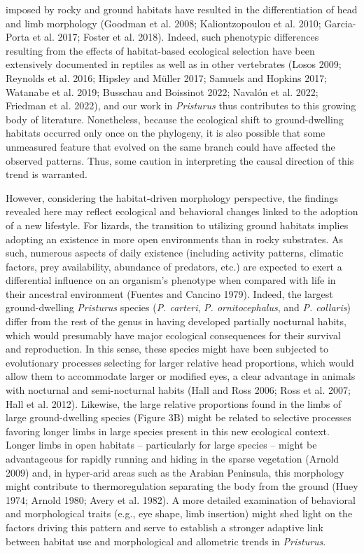 \documentclass[
  11pt,
]{article}
\begin{document}
imposed by rocky and ground habitats have resulted in the
differentiation of head and limb morphology (Goodman et al. 2008;
Kaliontzopoulou et al. 2010; Garcia-Porta et al. 2017; Foster et al.
2018). Indeed, such phenotypic differences resulting from the effects of
habitat-based ecological selection have been extensively documented in
reptiles as well as in other vertebrates (Losos 2009; Reynolds et al.
2016; Hipsley and Müller 2017; Samuels and Hopkins 2017; Watanabe et al.
2019; Busschau and Boissinot 2022; Navalón et al. 2022; Friedman et al.
2022), and our work in \emph{Pristurus} thus contributes to this growing
body of literature. Nonetheless, because the ecological shift to
ground-dwelling habitats occurred only once on the phylogeny, it is also
possible that some unmeasured feature that evolved on the same branch
could have affected the observed patterns. Thus, some caution in
interpreting the causal direction of this trend is warranted.
\hfill\break

However, considering the habitat-driven morphology perspective, the
findings revealed here may reflect ecological and behavioral changes
linked to the adoption of a new lifestyle. For lizards, the transition
to utilizing ground habitats implies adopting an existence in more open
environments than in rocky substrates. As such, numerous aspects of
daily existence (including activity patterns, climatic factors, prey
availability, abundance of predators, etc.) are expected to exert a
differential influence on an organism's phenotype when compared with
life in their ancestral environment (Fuentes and Cancino 1979). Indeed,
the largest ground-dwelling \emph{Pristurus} species (\emph{P. carteri},
\emph{P. ornitocephalus}, and \emph{P. collaris}) differ from the rest
of the genus in having developed partially nocturnal habits, which would
presumably have major ecological consequences for their survival and
reproduction. In this sense, these species might have been subjected to
evolutionary processes selecting for larger relative head proportions,
which would allow them to accommodate larger or modified eyes, a clear
advantage in animals with nocturnal and semi-nocturnal habits (Hall and
Ross 2006; Ross et al. 2007; Hall et al. 2012). Likewise, the large
relative proportions found in the limbs of large ground-dwelling species
(Figure 3B) might be related to selective processes favoring longer
limbs in large species present in this new ecological context. Longer
limbs in open habitats -- particularly for large species -- might be
advantageous for rapidly running and hiding in the sparse vegetation
(Arnold 2009) and, in hyper-arid areas such as the Arabian Peninsula,
this morphology might contribute to thermoregulation separating the body
from the ground (Huey 1974; Arnold 1980; Avery et al. 1982). A more
detailed examination of behavioral and morphological traits (e.g., eye
shape, limb insertion) might shed light on the factors driving this
pattern and serve to establish a stronger adaptive link between habitat
use and morphological and allometric trends in \emph{Pristurus}.
\hfill\break
\end{document}
